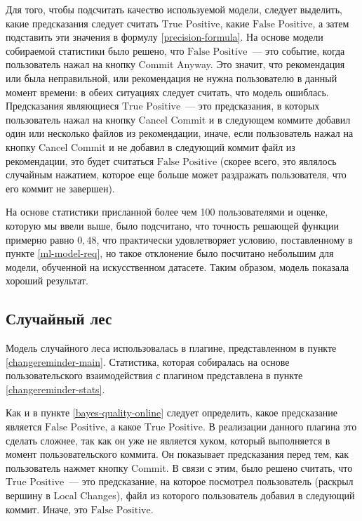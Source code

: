 Для того, чтобы подсчитать качество используемой модели, следует выделить, какие предсказания следует считать $\text{True Positive}$, какие $\text{False Positive}$, а затем подставить эти значения в формулу \ref{precision-formula}. На основе модели собираемой статистики было решено, что $\text{False Positive}$~--- это событие, когда пользователь нажал на кнопку Commit Anyway. Это значит, что рекомендация или была неправильной, или рекомендация не нужна пользователю в данный момент времени: в обеих ситуациях следует считать, что модель ошиблась. Предсказания являющиеся $\text{True Positive}$~--- это предсказания, в которых пользователь нажал на кнопку Cancel Commit и в следующем коммите добавил один или несколько файлов из рекомендации, иначе, если пользователь нажал на кнопку Cancel Commit и не добавил в следующий коммит файл из рекомендации, это будет считаться $\text{False Positive}$ (скорее всего, это являлось случайным нажатием, которое еще больше может раздражать пользователя, что его коммит не завершен).

На основе статистики присланной более чем 100 пользователями и оценке, которую мы ввели выше, было подсчитано, что точность решающей функции примерно равно $0,48$, что практически удовлетворяет условию, поставленному в пункте \ref{ml-model-req}, но такое отклонение было посчитано небольшим для модели, обученной на искусственном датасете. Таким образом, модель показала хороший результат.
    \subsection{Случайный лес}\label{forest-quality-online}
Модель случайного леса использовалась в плагине, представленном в пункте \ref{changereminder-main}. Статистика, которая собиралась на основе пользовательского взаимодействия с плагином представлена в пункте \ref{changereminder-stats}.

Как и в пункте \ref{bayes-quality-online} следует определить, какое предсказание является $\text{False Positive}$, а какое $\text{True Positive}$. В реализации данного плагина это сделать сложнее, так как он уже не является хуком, который выполняется в момент пользовательского коммита. Он показывает предсказания перед тем, как пользователь нажмет кнопку Commit. В связи с этим, было решено считать, что $\text{True Positive}$~--- это предсказание, на которое посмотрел пользователь (раскрыл вершину в Local Changes), файл из которого пользователь добавил в следующий коммит. Иначе, это $\text{False Positive}$. 

